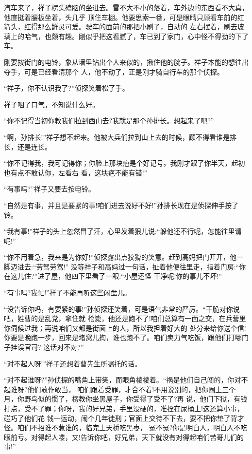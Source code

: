 \documentclass[11pt,a4paper,onecolumn]{article}
\begin{document}
汽车来了，祥子楞头磕脑的坐进去。雪不大不小的落着，车外边的东西看不大真，他直挺着腰板坐着，头几乎
顶住车棚。他要思索一番，可是眼睛只顾看车前的红箭头，红得那么鲜灵可爱。驶车的面前的那把小刷子，自动的
左右摆着，刷去玻璃上的哈气，也颇有趣。刚似乎把这看腻了，车已到了家门，心中怪不得劲的下了车。

刚要按街门的电铃，象从墙里钻出个人来似的，揪住他的腕子。祥子本能的想往出夺手，可是已经看清那个
人，他不动了，正是刚才骑自行车的那个侦探。

``祥子，你不认识我了?''侦探笑着松了手。

祥子咽了口气，不知说什么好。

``你不记得当初你教我们拉到西山去?我就是那个孙排长。想起来了吧?''

``啊，孙排长!''祥子想不起来。他被大兵们拉到山上去的时候，顾不得看谁是排长，还是连长。

``你不记得我，我可记得你；你脸上那块疤是个好记号。我刚才跟了你半天，起初也有点不敢认你，左看右
看，这块疤不能有错!''

``有事吗?''祥子又要去按电铃。

``自然是有事，并且是要紧的事!咱们进去说好不好!''孙排长\myrule 现在是侦探\myrule 伸手按了铃。

``我有事!''祥子的头上忽然冒了汗，心里发着狠儿说:``躲他还不行呢，怎能往里请呢!''

``你不用着急，我来是为你好!''侦探露出点狡猾的笑意。赶到高妈把门开开，他一脚迈进去:``劳驾劳驾!''
没等祥子和高妈过一句话，扯着他便往里走，指着门房:``你在这儿住?''进了屋，他四下里看了一眼:``小屋还怪
干净呢!你的事儿不坏!''

``有事吗?我忙!''祥子不能再听这些闲盘儿。

``没告诉你吗，有要紧的事!''孙侦探还笑着，可是语气非常的严厉。``干脆对你说吧，姓曹的是乱党，拿住就
枪毙，他还是跑不了!咱们总算有一面之交，在兵营里你伺候过我；再说咱们又都是街面上的人，所以我担着好大的
处分来给你送个信!你要是晚跑一步，回来是堵窝儿掏，谁也跑不了。咱们卖力气吃饭，跟他们打哪门子挂误官司?
这话对不对?''

``对不起人呀!''祥子还想着曹先生所嘱托的话。

``对不起谁呀?''孙侦探的嘴角上带笑，而眼角棱棱着。``祸是他们自己闯的，你对不起谁呀?他们敢作敢当，
咱们跟着受罪，才合不着!不用说别的，把你圈上三个月，你野鸟似的惯了，楞教你坐黑屋子，你受得了受不了?再
说，他们下狱，有钱打点，受不了罪；你呀，我的好兄弟，手里没硬的，准拴在尿桶上!这还算小事，碰巧了他们花
钱一运动，闹个几年徒刑；官面上交待不下去，要不把你垫了背才怪。咱们不招谁不惹谁的，临完上天桥吃黑枣，
冤不冤?你是明白人，明白人不吃眼前亏。对得起人喽，又!告诉你吧，好兄弟，天下就没有对得起咱们苦哥儿们的
事!''
\end{document}
